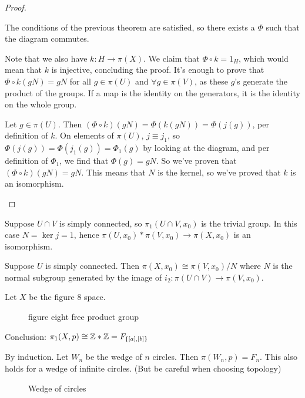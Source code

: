 \begin{proof}
\begin{itemize}
            The conditions of the previous theorem are satisfied, so there exists a $\Phi$ such that the diagram commutes.

            Note that we also have $k: H \to  \pi(X)$.
            We claim that $\Phi  \circ  k = 1_H$, which would mean that $k$ is injective, concluding the proof.
            It's enough to prove that $\Phi  \circ  k(gN) = gN$ for all $g \in \pi(U)$ and $\forall g \in \pi(V)$, as these $g$'s generate the product of the groups. If a map is the identity on the generators, it is the identity on the whole group.

            Let $g \in \pi(U)$. Then $(\Phi  \circ  k) (gN) = \Phi(k(gN)) = \Phi(j(g))$, per definition of $k$.
            On elements of $\pi(U)$, $j \equiv j_1$, so $\Phi(j(g)) = \Phi(j_1(g)) = \Phi_1(g)$ by looking at the diagram, and per definition of $\Phi_1$, we find that $\Phi(g) = gN$. So we've proven that $(\Phi  \circ  k) (gN) = gN$.
            This means that $N$ is the kernel, so we've proved that $k$ is an isomorphism.
    \end{itemize}
\end{proof}
\begin{corollary}
    Suppose $ U \cap  V$ is simply connected, so $\pi_1(U \cap V, x_0)$ is the trivial group.
    In this case $N = \ker j = 1$, hence $\pi(U, x_0) * \pi(V, x_0) \to \pi(X, x_0)$ is an isomorphism.
\end{corollary}

\begin{corollary}
    Suppose $U$ is simply connected.
    Then $\pi(X, x_0) \cong \pi(V, x_0) / N$ where $N$ is the normal subgroup generated by the image of $i_2: \pi(U \cap V) \to  \pi(V, x_0)$.
\end{corollary}
\begin{eg}
    Let $X$ be the figure $8$ space.

\begin{figure}[H]
    \centering
    \caption{figure eight free product group}
    \label{fig:figure-eight-free-product-group}
\end{figure}
Conclusion: $\pi_1(X, p) \cong \mathbb{Z} * \mathbb{Z} = F_{\{[a], [b]\} }$
\end{eg}

\begin{eg}
    By induction. Let $W_n$ be the wedge of $n$ circles.
    Then $\pi(W_n, p) = F_n$.
    This also holds for a wedge of infinite circles. (But be careful when choosing topology)
\begin{figure}[H]
    \centering
    \caption{Wedge of circles}
    \label{fig:wedge-circles}
\end{figure}
\end{eg}

